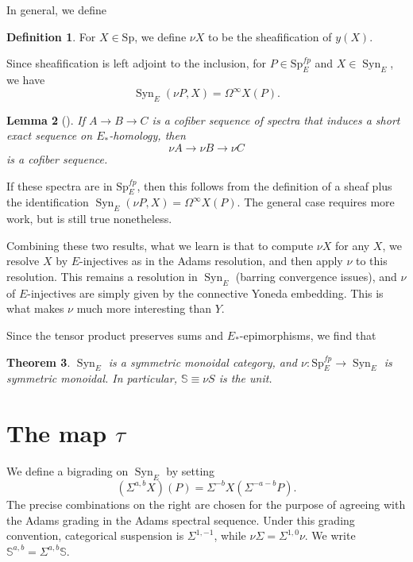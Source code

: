 \documentclass{shortart}
\newtheorem{thm}{Theorem}[section]
\newtheorem{lemma}[thm]{Lemma}
\theoremstyle{definition}
\newtheorem{defi}[thm]{Definition}
\renewcommand\S{{\mathbb{S}}}
\newcommand\Sp{{\mathrm{Sp}}}
\DeclareMathOperator\Syn{Syn}
\begin{document}
In general, we define
\begin{defi}
  For $X \in \Sp$, we define $\nu X$ to be the sheafification of $y(X)$.
\end{defi}

Since sheafification is left adjoint to the inclusion, for $P \in \Sp_E^{fp}$ and $X \in \Syn_E$, we have
\[
  \Syn_E(\nu P, X) = \Omega^\infty X(P).
\]

\begin{lemma}[{\cite[Lemma 4.23]{synthetic}}]
  If $A \to B \to C$ is a cofiber sequence of spectra that induces a short exact sequence on $E_*$-homology, then
  \[
    \nu A \to \nu B \to \nu C
  \]
  is a cofiber sequence.
\end{lemma}
If these spectra are in $\Sp_E^{fp}$, then this follows from the definition of a sheaf plus the identification $\Syn_E(\nu P, X) = \Omega^\infty X(P)$. The general case requires more work, but is still true nonetheless.

Combining these two results, what we learn is that to compute $\nu X$ for any $X$, we resolve $X$ by $E$-injectives as in the Adams resolution, and then apply $\nu$ to this resolution. This remains a resolution in $\Syn_E$ (barring convergence issues), and $\nu$ of $E$-injectives are simply given by the connective Yoneda embedding. This is what makes $\nu$ much more interesting than $Y$.

Since the tensor product preserves sums and $E_*$-epimorphisms, we find that
\begin{thm}
  $\Syn_E$ is a symmetric monoidal category, and $\nu\colon \Sp_E^{fp} \to \Syn_E$ is symmetric monoidal. In particular, $\S \equiv \nu S$ is the unit.
\end{thm}

\section{The map \texorpdfstring{$\tau$}{tau}}\label{section:tau}
We define a bigrading on $\Syn_E$ by setting
\[
  (\Sigma^{a, b} X)(P) = \Sigma^{-b} X(\Sigma^{-a - b} P).
\]
The precise combinations on the right are chosen for the purpose of agreeing with the Adams grading in the Adams spectral sequence. Under this grading convention, categorical suspension is $\Sigma^{1, -1}$, while $\nu \Sigma = \Sigma^{1, 0} \nu$. We write $\S^{a, b} = \Sigma^{a, b} \S$.
\end{document}

